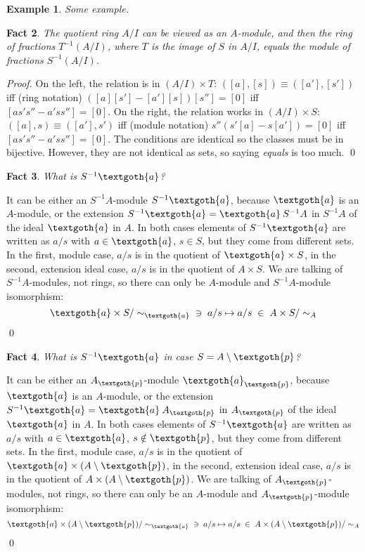 \documentclass{article}
\newtheorem{theorem}{Fact}[section]
\newtheorem{example}[theorem]{Example}
\begin{document}
\bigskip
\begin{example}
Some example.
\end{example}

\vspace{.2em}
\begin{theorem}
The quotient ring $A/I$ can be viewed as an $A$-module, and then the ring of fractions $T^{-1}(A/I)$, where $T$ is the image of $S$ in $A/I$, equals the module of fractions $S^{-1}(A/I)$.
\end{theorem} 

\noindent
\textit{Proof.} On the left, the relation is in $ (A/I) \times T $: $ ([a], [s]) \equiv ([a'], [s']) $ iff (ring notation) $([a][s'] - [a'][s]) [s''] = [0]$ iff $[as's'' - a'ss''] = [0]$. On the right, the relation works in $ (A/I) \times S $: $ ([a], s) \equiv ([a'], s') $ iff (module notation) $s'' (s'[a] - s[a']) = [0]$ iff $[as's'' - a'ss''] = [0]$. The conditions are identical so the classes must be in bijective. However, they are not identical as sets, so saying \textit{equals} is too much.
\qed

\bigskip
\begin{theorem}
What is $S^{-1}\textgoth{a}$?
\end{theorem}

\noindent
It can be either an $S^{-1}A$-module $S^{-1}\textgoth{a}$, because $\textgoth{a}$ is an $A$-module, or the extension $S^{-1}\textgoth{a} = \textgoth{a} \: S^{-1}A$ in $S^{-1}A$ of the ideal $\textgoth{a}$ in $A$. In both cases elements of $S^{-1}\textgoth{a}$ are written as $a/s$ with $a \in \textgoth{a}$, $s \in S$, but they come from different sets. In the first, module case, $a/s$ is in the quotient of $\textgoth{a} \times S$, in the second, extension ideal case, $a/s$ is in the quotient of $A \times S$. We are talking of $S^{-1}A$-modules, not rings, so there can only be $A$-module and $S^{-1}A$-module isomorphism:
\[
  \textgoth{a} \times S / \sim_\textgoth{a} \; \; \ni \; a/s \mapsto a/s \; \in \; A \times S / \sim_A
\]
\qed

\bigskip
\begin{theorem}
What is $S^{-1}\textgoth{a}$ in case $S = A \setminus \textgoth{p}$?
\end{theorem}

\noindent
It can be either an $A_\textgoth{p}$-module $\textgoth{a}_\textgoth{p}$, because $\textgoth{a}$ is an $A$-module, or the extension $S^{-1}\textgoth{a} = \textgoth{a} \: A_\textgoth{p}$ in $A_\textgoth{p}$ of the ideal $\textgoth{a}$ in $A$. In both cases elements of $S^{-1}\textgoth{a}$ are written as $a/s$ with $a \in \textgoth{a}$, $s \notin \textgoth{p}$, but they come from different sets. In the first, module case, $a/s$ is in the quotient of $\textgoth{a} \times (A \setminus\textgoth{p})$, in the second, extension ideal case, $a/s$ is in the quotient of $A \times (A \setminus\textgoth{p})$. We are talking of $A_\textgoth{p}$-modules, not rings, so there can only be an $A$-module and $A_\textgoth{p}$-module isomorphism:
\[
  \textgoth{a} \times (A \setminus\textgoth{p}) / \sim_\textgoth{a} \; \; \ni \; a/s \mapsto a/s \; \in \; A \times (A \setminus\textgoth{p}) / \sim_A
\]
\qed
\end{document}
